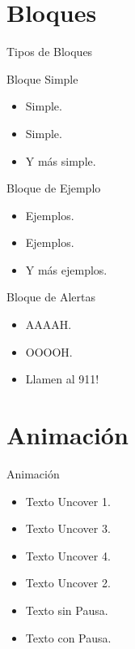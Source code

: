 \documentclass{IFES-beamer}
\begin{document}
\section{Bloques}
\begin{frame}{Tipos de Bloques}

\begin{block}{Bloque Simple}
\begin{itemize}
  \item Simple.
  \item Simple.
  \item Y más simple.
\end{itemize}
\end{block}

\begin{exampleblock}{Bloque de Ejemplo}
\begin{itemize}
  \item Ejemplos.
  \item Ejemplos.
  \item Y más ejemplos.
\end{itemize}
\end{exampleblock}

\begin{alertblock}{Bloque de Alertas}
\begin{itemize}
  \item AAAAH.
  \item OOOOH.
  \item Llamen al 911!
\end{itemize}
\end{alertblock}

\end{frame}

\section{Animación}
\begin{frame}{Animación}

\begin{itemize}
\item<1-> Texto Uncover 1.
\item<3-> Texto Uncover 3.
\item<4-> Texto Uncover 4.
\item<2-> Texto Uncover 2.
\end{itemize}

\begin{itemize}
\item Texto sin Pausa.
\pause \item Texto con Pausa.
\end{itemize}

\end{frame}
\end{document}
